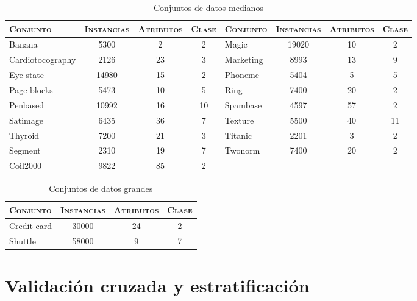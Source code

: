 \begin{table}[h!]
\centering
\begin{adjustbox}{max width =\textwidth}
\begin{tabular}{l c c c|l c c c}
\hline
\textsc{Conjunto} & \textsc{Instancias} & \textsc{Atributos} & \textsc{Clase} & \textsc{Conjunto} & \textsc{Instancias} & \textsc{Atributos} & \textsc{Clase} \\
\hline
\hline

Banana           &  5300 &  2 & 2 & Magic            & 19020 & 10 & 2 \\
Cardiotocography &  2126 & 23 & 3 & Marketing        &  8993 & 13 & 9 \\
Eye-state        & 14980 & 15 & 2 & Phoneme          &  5404 & 5  & 5 \\
Page-blocks      &  5473 & 10 & 5 & Ring             &  7400 & 20 & 2 \\
Penbased         & 10992 & 16 & 10 & Spambase         &  4597 & 57 & 2 \\
Satimage         &  6435 & 36 & 7 & Texture          &  5500 & 40 & 11 \\
Thyroid          &  7200 & 21 & 3 & Titanic          &  2201 &  3 & 2  \\
Segment          &  2310 & 19 & 7 & Twonorm          &  7400 & 20 & 2 \\
Coil2000         &  9822 & 85 & 2 & & & & \\


\hline
\end{tabular}
\end{adjustbox}
\caption{Conjuntos de datos medianos}
\label{medianos}
\end{table}


\begin{table}[h!]
\centering
\begin{tabular}{l c c c}
\hline
\textsc{Conjunto} & \textsc{Instancias} & \textsc{Atributos} & \textsc{Clase} \\
\hline
\hline

Credit-card      & 30000 & 24 & 2 \\
Shuttle          & 58000 & 9  & 7 \\

\hline
\end{tabular}
\caption{Conjuntos de datos grandes}
\label{grandes}
\end{table}


\section{Validación cruzada y estratificación}

